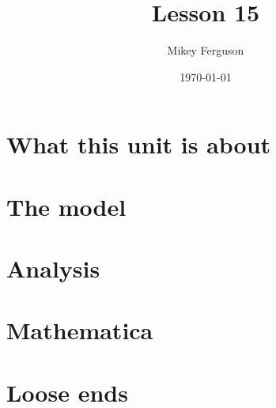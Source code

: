 \documentclass[11pt]{article}
\title{Lesson 15}
\author{Mikey Ferguson}
\date{\today}
\begin{document}
\maketitle
\tableofcontents
\bigskip

\section{What this unit is about}

\section{The model}

\section{Analysis}

\section{Mathematica}

\section{Loose ends}
\end{document}
